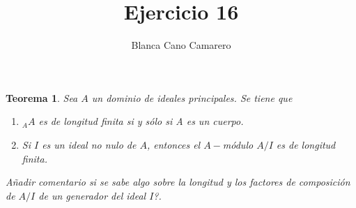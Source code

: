 \documentclass{article}
\title{Ejercicio 16}
\author{Blanca Cano Camarero}
\newtheorem*{teorema*}{Teorema}
\begin{document}
\maketitle

\begin{teorema*}
    Sea $A$ un dominio de ideales principales. 
    Se tiene que
    \begin{enumerate}[i]
        \item ${_A}A$ es de longitud finita si y sólo si A es un cuerpo.
        \item Si $I$ es un ideal no nulo de $A$, entonces el $A-$módulo $A/I$ es de longitud finita. 
    \end{enumerate}
    Añadir comentario si se sabe algo sobre la longitud y los factores de composición de $A/I$ de un generador del ideal $I$?.
\end{teorema*}   
\end{document}
